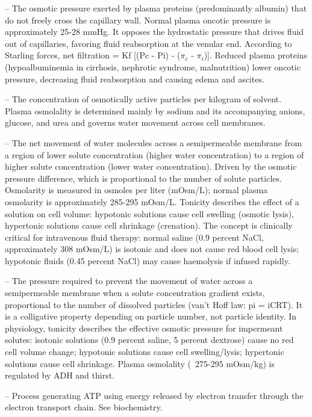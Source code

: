 -- The osmotic pressure exerted by plasma proteins (predominantly albumin) that do not freely cross the capillary wall. Normal plasma oncotic pressure is approximately 25-28 mmHg. It opposes the hydrostatic pressure that drives fluid out of capillaries, favoring fluid reabsorption at the venular end. According to Starling forces, net filtration = Kf [(Pc - Pi) - ($\pi_c$ - $\pi_i$)]. Reduced plasma proteins (hypoalbuminemia in cirrhosis, nephrotic syndrome, malnutrition) lower oncotic pressure, decreasing fluid reabsorption and causing edema and ascites.

-- The concentration of osmotically active particles per kilogram of solvent. Plasma osmolality is determined mainly by sodium and its accompanying anions, glucose, and urea and governs water movement across cell membranes.

-- The net movement of water molecules across a semipermeable membrane from a region of lower solute concentration (higher water concentration) to a region of higher solute concentration (lower water concentration). Driven by the osmotic pressure difference, which is proportional to the number of solute particles. Osmolarity is measured in osmoles per liter (mOsm/L); normal plasma osmolarity is approximately 285-295 mOsm/L. Tonicity describes the effect of a solution on cell volume: hypotonic solutions cause cell swelling (osmotic lysis), hypertonic solutions cause cell shrinkage (crenation). The concept is clinically critical for intravenous fluid therapy: normal saline (0.9 percent NaCl, approximately 308 mOsm/L) is isotonic and does not cause red blood cell lysis; hypotonic fluids (0.45 percent NaCl) may cause haemolysis if infused rapidly.

-- The pressure required to prevent the movement of water across a semipermeable membrane when a solute concentration gradient exists, proportional to the number of dissolved particles (van't Hoff law: pi = iCRT). It is a colligative property depending on particle number, not particle identity. In physiology, tonicity describes the effective osmotic pressure for impermeant solutes: isotonic solutions (0.9 percent saline, 5 percent dextrose) cause no red cell volume change; hypotonic solutions cause cell swelling/lysis; hypertonic solutions cause cell shrinkage. Plasma osmolality (~275-295 mOsm/kg) is regulated by ADH and thirst.

-- Process generating ATP using energy released by electron transfer through the electron transport chain. See biochemistry.

